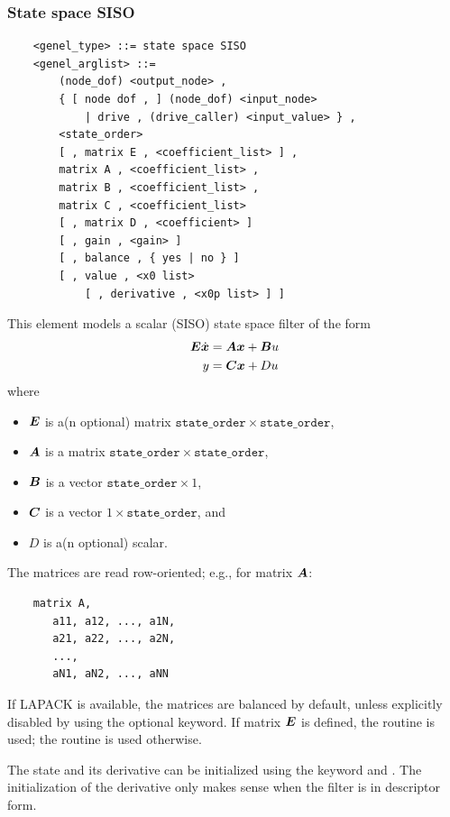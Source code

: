 \subsubsection{State space SISO}
\label{sec:EL:GENEL:STATE-SPACE-SISO}
\begin{verbatim}
    <genel_type> ::= state space SISO
    <genel_arglist> ::=
        (node_dof) <output_node> ,
        { [ node dof , ] (node_dof) <input_node>
            | drive , (drive_caller) <input_value> } ,
        <state_order>
        [ , matrix E , <coefficient_list> ] ,
        matrix A , <coefficient_list> ,
        matrix B , <coefficient_list> ,
        matrix C , <coefficient_list>
        [ , matrix D , <coefficient> ]
        [ , gain , <gain> ]
        [ , balance , { yes | no } ]
        [ , value , <x0 list>
            [ , derivative , <x0p list> ] ]
\end{verbatim}
This element models a scalar (SISO) state space filter of the form
\begin{align*}
	\boldsymbol{E} \dot{\boldsymbol{x}} &= \boldsymbol{A} \boldsymbol{x} + \boldsymbol{B} u \\
	y &= \boldsymbol{C} \boldsymbol{x} + D u
\end{align*}
where
\begin{itemize}
\item $\boldsymbol{E}$ is a(n optional) matrix
	$\mathtt{state\_order} \times \mathtt{state\_order}$,
\item $\boldsymbol{A}$ is a matrix
	$\mathtt{state\_order} \times \mathtt{state\_order}$,
\item $\boldsymbol{B}$ is a vector
	$\mathtt{state\_order} \times 1$,
\item $\boldsymbol{C}$ is a vector
	$1 \times \mathtt{state\_order}$, and
\item $D$ is a(n optional) scalar.
\end{itemize}
The matrices are read row-oriented; e.g., for matrix $\boldsymbol{A}$:
\begin{verbatim}
    matrix A,
       a11, a12, ..., a1N,
       a21, a22, ..., a2N,
       ...,
       aN1, aN2, ..., aNN
\end{verbatim}

If LAPACK is available, the matrices are balanced by default,
unless explicitly disabled by using the  optional keyword.
If matrix $\boldsymbol{E}$ is defined, the  routine is used;
the  routine is used otherwise.

The state and its derivative can be initialized using the keyword 
and .
The initialization of the derivative only makes sense when the filter
is in descriptor form.

